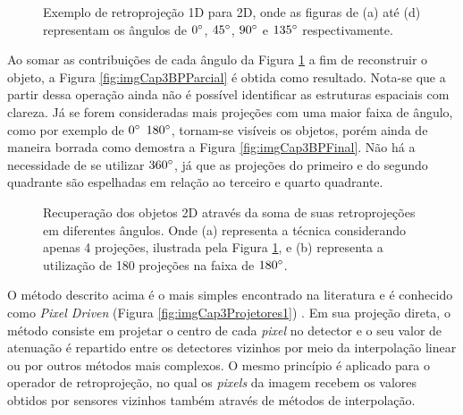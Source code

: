 \begin{figure}[H]
	\centering
	
	\caption{Exemplo de retroprojeção \acs{1D} para \acs{2D}, onde as figuras de (a) até (d) representam os ângulos de $0\degree$, $45\degree$, $90\degree$ e $135\degree$ respectivamente.}
	
	\hfil
	\hfil
	\hfil
	\hfil
	
	\label{fig:imgCap3BPMosaico}
\end{figure}


Ao somar as contribuições de cada ângulo da Figura \ref{fig:imgCap3BPMosaico} a fim de reconstruir o objeto, a Figura \ref{fig:imgCap3BPParcial} é obtida como resultado. Nota-se que a partir dessa operação ainda não é possível identificar as estruturas espaciais com clareza. Já se forem consideradas mais projeções com uma maior faixa de ângulo, como por exemplo de $0\degree$  $180\degree$, tornam-se visíveis os objetos, porém ainda de maneira borrada como demostra a Figura \ref{fig:imgCap3BPFinal}. Não há a necessidade de se utilizar $360\degree$, já que as projeções do primeiro e do segundo quadrante são espelhadas em relação ao terceiro e quarto quadrante.   

\begin{figure}[H]
	\centering
	
	\caption{Recuperação dos objetos \acs{2D} através da soma de suas retroprojeções em diferentes ângulos. Onde (a) representa a técnica considerando apenas 4 projeções, ilustrada pela Figura \ref{fig:imgCap3BPMosaico}, e (b) representa a utilização de 180 projeções na faixa de $180\degree$.}
	
	\hfil
	\hfil
	
	\label{fig:imgCap3BPSoma}
\end{figure}

O método descrito acima é o mais simples encontrado na literatura e é conhecido como \textit{Pixel Driven} (Figura \ref{fig:imgCap3Projetores1}) \cite[p. 47]{levakhina2014three}. Em sua projeção direta, o método consiste em projetar o centro de cada \textit{pixel} no detector e o seu valor de atenuação é repartido entre os detectores vizinhos por meio da interpolação linear ou por outros métodos mais complexos. O mesmo princípio é aplicado para o operador de retroprojeção, no qual os \textit{pixels} da imagem recebem os valores obtidos por sensores vizinhos também através de métodos de interpolação.

